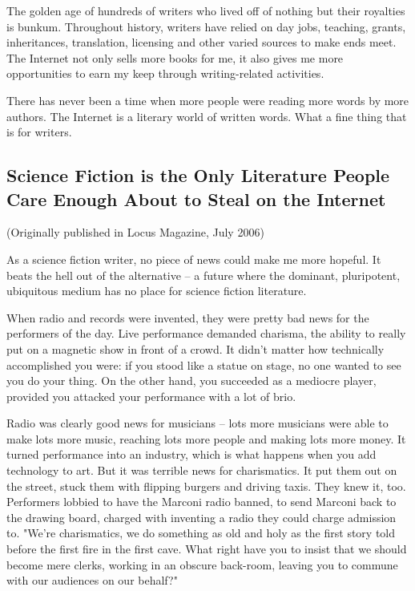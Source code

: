 The golden age of hundreds of writers who lived off of nothing but
their royalties is bunkum. Throughout history, writers have relied
on day jobs, teaching, grants, inheritances, translation, licensing
and other varied sources to make ends meet. The Internet not only
sells more books for me, it also gives me more opportunities to
earn my keep through writing-related activities.

There has never been a time when more people were reading more
words by more authors. The Internet is a literary world of written
words. What a fine thing that is for writers.

\subsection{Science Fiction is the Only Literature People Care Enough About to Steal on the Internet}

(Originally published in Locus Magazine, July 2006)

As a science fiction writer, no piece of news could make me more
hopeful. It beats the hell out of the alternative -- a future where
the dominant, pluripotent, ubiquitous medium has no place for
science fiction literature.

When radio and records were invented, they were pretty bad news for
the performers of the day. Live performance demanded charisma, the
ability to really put on a magnetic show in front of a crowd. It
didn't matter how technically accomplished you were: if you stood
like a statue on stage, no one wanted to see you do your thing. On
the other hand, you succeeded as a mediocre player, provided you
attacked your performance with a lot of brio.

Radio was clearly good news for musicians -- lots more musicians
were able to make lots more music, reaching lots more people and
making lots more money. It turned performance into an industry,
which is what happens when you add technology to art. But it was
terrible news for charismatics. It put them out on the street,
stuck them with flipping burgers and driving taxis. They knew it,
too. Performers lobbied to have the Marconi radio banned, to send
Marconi back to the drawing board, charged with inventing a radio
they could charge admission to. "We're charismatics, we do
something as old and holy as the first story told before the first
fire in the first cave. What right have you to insist that we
should become mere clerks, working in an obscure back-room, leaving
you to commune with our audiences on our behalf?"

